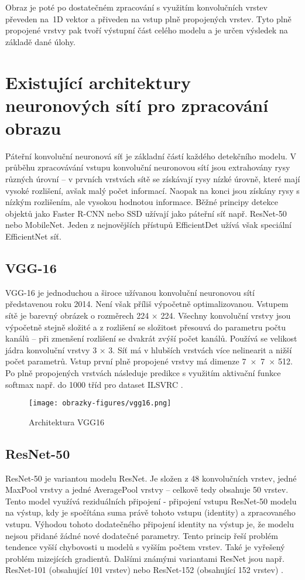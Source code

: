 Obraz je poté po dostatečném zpracování s využitím konvolučních vrstev převeden na~1D vektor a přiveden na vstup plně propojených vrstev. Tyto plně propojené vrstvy pak tvoří výstupní část celého modelu a je určen výsledek na základě dané úlohy.

\section{Existující architektury neuronových sítí pro zpracování obrazu}
Páteřní konvoluční neuronová síť je základní částí každého detekčního modelu. V průběhu zpracovávání vstupu konvoluční neuronovou sítí jsou extrahovány rysy různých úrovní -- v prvních vrstvách sítě se získávají rysy nízké úrovně, které mají vysoké rozlišení, avšak malý počet informací. Naopak na konci jsou získány rysy s nízkým rozlišením, ale vysokou hodnotou informace. Běžné principy detekce objektů jako Faster R-CNN nebo SSD užívají jako páteřní síť např. ResNet-50 nebo MobileNet. Jeden z nejnovějších přístupů EfficientDet užívá však speciální EfficientNet síť.
\subsection*{VGG-16}
VGG-16 je jednoduchou a široce užívanou konvoluční neuronovou sítí představenou roku 2014. Není však příliš výpočetně optimalizovanou. Vstupem sítě je barevný obrázek o rozměrech 224 $\times$ 224. Všechny konvoluční vrstvy jsou výpočetně stejně složité a z rozlišení se složitost přesouvá do parametru počtu kanálů -- při zmenšení rozlišení se dvakrát zvýší počet kanálů. Používá se velikost jádra konvoluční vrstvy 3 $\times$ 3. Síť má v hlubších vrstvách více nelinearit a nižší počet parametrů. Vstup první plně propojené vrstvy má dimenze 7~$\times$~7~$\times$ 512. Po plně propojených vrstvách následuje predikce s využitím aktivační funkce softmax např. do 1000 tříd pro dataset ILSVRC \cite{VGG16}.

\begin{figure}[!htbp]
    \centering
    \texttt{[image: obrazky-figures/vgg16.png]}
    \caption{Architektura VGG16 \cite{VGG16}}
\end{figure}

\subsection*{ResNet-50}
ResNet-50 je variantou modelu ResNet. Je složen z 48 konvolučních vrstev, jedné MaxPool vrstvy a jedné AveragePool vrstvy -- celkově tedy obsahuje 50 vrstev. Tento model využívá reziduálních připojení - připojení vstupu ResNet-50 modelu na výstup, kdy je spočítána suma právě tohoto vstupu (identity) a zpracovaného vstupu. Výhodou tohoto dodatečného připojení identity na výstup je, že modelu nejsou přidané žádné nové dodatečné parametry. Tento princip řeší problém tendence vyšší chybovosti u modelů s vyšším počtem vrstev. Také je vyřešený problém mizejících gradientů. Dalšími známými variantami ResNet jsou např. ResNet-101 (obsahující 101 vrstev) nebo ResNet-152 (obsahující 152 vrstev) \cite{ResNet50}.
